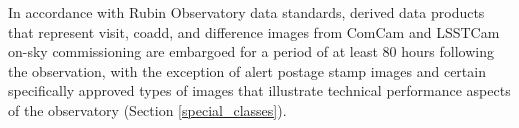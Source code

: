 \documentclass[SE,authoryear,toc]{lsstdoc}
\begin{document}






In accordance with Rubin Observatory data standards, derived data products that represent visit, coadd, and difference images from ComCam and LSSTCam on-sky commissioning are embargoed for a period of at least 80 hours following the observation, with the exception of alert postage stamp images and certain specifically approved types of images that illustrate technical performance aspects of the observatory (Section \ref{special_classes}).

\end{document}
